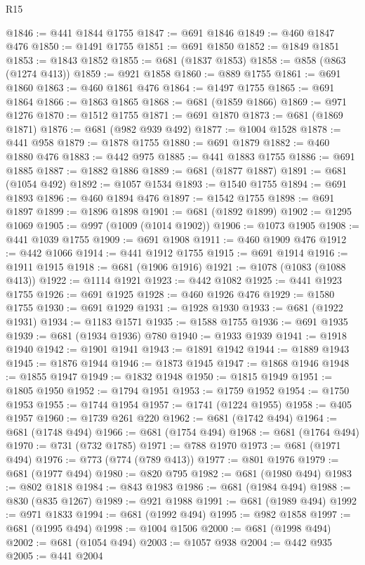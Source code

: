 \begin{lexlean}{R15}
\begin{coremodule}
@1846 := @441 @1844 @1755
@1847 := @691 @1846
@1849 := @460 @1847 @476
@1850 := @1491 @1755
@1851 := @691 @1850
@1852 := @1849 @1851
@1853 := @1843 @1852
@1855 := @681 (@1837 @1853)
@1858 := @858 (@863 (@1274 @413))
@1859 := @921 @1858
@1860 := @889 @1755
@1861 := @691 @1860
@1863 := @460 @1861 @476
@1864 := @1497 @1755
@1865 := @691 @1864
@1866 := @1863 @1865
@1868 := @681 (@1859 @1866)
@1869 := @971 @1276
@1870 := @1512 @1755
@1871 := @691 @1870
@1873 := @681 (@1869 @1871)
@1876 := @681 (@982 @939 @492)
@1877 := @1004 @1528
@1878 := @441 @958
@1879 := @1878 @1755
@1880 := @691 @1879
@1882 := @460 @1880 @476
@1883 := @442 @975
@1885 := @441 @1883 @1755
@1886 := @691 @1885
@1887 := @1882 @1886
@1889 := @681 (@1877 @1887)
@1891 := @681 (@1054 @492)
@1892 := @1057 @1534
@1893 := @1540 @1755
@1894 := @691 @1893
@1896 := @460 @1894 @476
@1897 := @1542 @1755
@1898 := @691 @1897
@1899 := @1896 @1898
@1901 := @681 (@1892 @1899)
@1902 := @1295 @1069
@1905 := @997 (@1009 (@1014 @1902))
@1906 := @1073 @1905
@1908 := @441 @1039 @1755
@1909 := @691 @1908
@1911 := @460 @1909 @476
@1912 := @442 @1066
@1914 := @441 @1912 @1755
@1915 := @691 @1914
@1916 := @1911 @1915
@1918 := @681 (@1906 @1916)
@1921 := @1078 (@1083 (@1088 @413))
@1922 := @1114 @1921
@1923 := @442 @1082
@1925 := @441 @1923 @1755
@1926 := @691 @1925
@1928 := @460 @1926 @476
@1929 := @1580 @1755
@1930 := @691 @1929
@1931 := @1928 @1930
@1933 := @681 (@1922 @1931)
@1934 := @1183 @1571
@1935 := @1588 @1755
@1936 := @691 @1935
@1939 := @681 (@1934 @1936) @780
@1940 := @1933 @1939
@1941 := @1918 @1940
@1942 := @1901 @1941
@1943 := @1891 @1942
@1944 := @1889 @1943
@1945 := @1876 @1944
@1946 := @1873 @1945
@1947 := @1868 @1946
@1948 := @1855 @1947
@1949 := @1832 @1948
@1950 := @1815 @1949
@1951 := @1805 @1950
@1952 := @1794 @1951
@1953 := @1759 @1952
@1954 := @1750 @1953
@1955 := @1744 @1954
@1957 := @1741 (@1224 @1955)
@1958 := @405 @1957
@1960 := @1739 @261 @220
@1962 := @681 (@1742 @494)
@1964 := @681 (@1748 @494)
@1966 := @681 (@1754 @494)
@1968 := @681 (@1764 @494)
@1970 := @731 (@732 @1785)
@1971 := @788 @1970
@1973 := @681 (@1971 @494)
@1976 := @773 (@774 (@789 @413))
@1977 := @801 @1976
@1979 := @681 (@1977 @494)
@1980 := @820 @795
@1982 := @681 (@1980 @494)
@1983 := @802 @1818
@1984 := @843 @1983
@1986 := @681 (@1984 @494)
@1988 := @830 (@835 @1267)
@1989 := @921 @1988
@1991 := @681 (@1989 @494)
@1992 := @971 @1833
@1994 := @681 (@1992 @494)
@1995 := @982 @1858
@1997 := @681 (@1995 @494)
@1998 := @1004 @1506
@2000 := @681 (@1998 @494)
@2002 := @681 (@1054 @494)
@2003 := @1057 @938
@2004 := @442 @935
@2005 := @441 @2004

\end{coremodule}
\end{lexlean}
